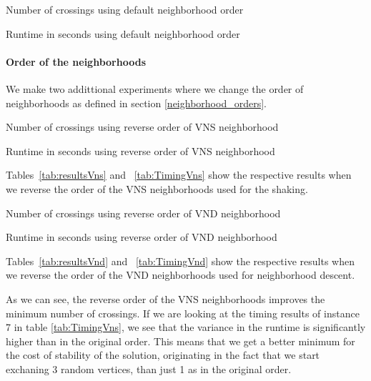 \documentclass{scrartcl}
\begin{document}
\begin{table}[H]
  \centering
  \scriptsize
  
\caption{Number of crossings using default neighborhood order}
\label{tab:resultsOverall}
\end{table}

\begin{table}[H]
  \centering
  \scriptsize
  
\caption{Runtime in seconds using default neighborhood order}
\label{tab:Timing}
\end{table}


\paragraph{Order of the neighborhoods}

We make two addittional experiments where we change the order of neighborhoods as defined
in section \ref{neighborhood_orders}.


\begin{table}[H]
  \centering
  \scriptsize
  
\caption{Number of crossings using reverse order of VNS neighborhood}
\label{tab:resultsVns}
\end{table}



\begin{table}[H]
  \centering
  \scriptsize
  
\caption{Runtime in seconds using reverse order of VNS neighborhood}
\label{tab:TimingVns}
\end{table}



Tables~\ref{tab:resultsVns} and ~\ref{tab:TimingVns} show the respective results when we reverse
the order of the VNS neighborhoods used for the shaking.

\begin{table}[H]
  \centering
  \scriptsize
  
\caption{Number of crossings using reverse order of VND neighborhood}
\label{tab:resultsVnd}
\end{table}

\begin{table}[H]
  \centering
  \scriptsize
  
\caption{Runtime in seconds using reverse order of VND neighborhood}
\label{tab:TimingVnd}
\end{table}

Tables~\ref{tab:resultsVnd} and ~\ref{tab:TimingVnd} show the respective results when we reverse
the order of the VND neighborhoods used for neighborhood descent.



As we can see, the reverse order of the VNS neighborhoods improves the minimum number of crossings. If we are looking
at the timing results of instance 7 in table \ref{tab:TimingVns}, we see that the variance in the runtime is significantly
higher than in the original order. This means that we get a better minimum for the cost of stability of the solution,
originating in the fact that we start exchaning 3 random vertices, than just 1 as in the original order.
\end{document}
